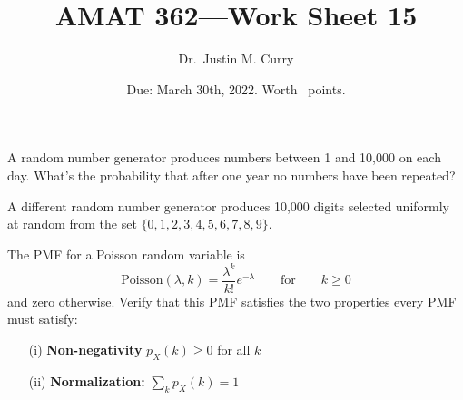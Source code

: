 \documentclass[addpoints,12pt]{exam}
\title{\vspace{-1in} AMAT 362---Work Sheet 15}
\date{Due: March 30th, 2022. Worth \numpoints\ points.}
\author{Dr.~Justin M. Curry}
\begin{document}
\maketitle






\begin{questions}

\question[1] A random number generator produces numbers between 1 and 10,000 on each day. What's the probability that after one year no numbers have been repeated?

\vspace{1.2in}

\question[3] 
A different random number generator produces 10,000 digits selected uniformly at random from the set $\{0,1,2,3,4,5,6,7,8,9\}$.
\noaddpoints
{}

\newpage

\question[2] The PMF for a Poisson random variable is $$\text{Poisson}(\lambda,k) = \frac{\lambda^k}{k!} e^{-\lambda} \qquad \text{for} \qquad k\geq 0$$ and zero otherwise.
Verify that this PMF satisfies the two properties every PMF must satisfy:
\begin{enumerate}
	\item[(i)] {\bf Non-negativity} $p_X(k)\geq 0$ for all $k$
	\item[(ii)] {\bf Normalization:} $\sum_k p_X(k) =1$
\end{enumerate}
\vspace{1.5in}


\end{questions}
\end{document}
